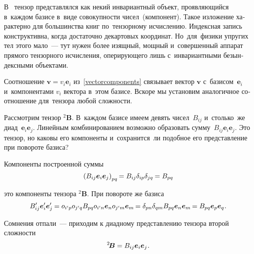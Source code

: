 
\label{para:polyadicrepresentation}

\begin{otherlanguage}{russian}

В~ тензор представлялся как некий инвариантный объект, проявляющийся в~каждом базисе в~виде совокупности чисел~(компонент). \hbox{Такое} изложение характерно для большинства книг по~тензорному исчислению. Индексная запись конструктивна, когда достаточно декартовых координат. Но~для~физики упругих тел этого мало~--- тут нужен более изящный, мощный и~совершенный аппарат прямого тензорного исчисления, оперирующего лишь с~инвариантными безындексными объектами.

Соотношение ${\bm{v} = v_i \bm{e}_i}$ из~\eqref{vectorcomponents} связывает вектор ${\bm{v}}$ с~базисом~${\bm{e}_i}$ и~компонентами ${v_i}$ вектора в~этом базисе. Вскоре мы установим аналогичное соотношение для~тензора любой сложности.

Рассмотрим тензор ${^2\!\bm{B}}$. В~каждом базисе имеем девять чисел~${B_{ij}}$ и~столько~же диад~${\bm{e}_i \bm{e}_j}$. Линейным комбинированием возможно образовать сумму~${B_{ij} \bm{e}_i \bm{e}_j}$. Это тензор, но каковы его компоненты и~сохранится~ли подобное его представление при повороте базиса?

Компоненты построенной суммы
\[
\left( B_{ij} \bm{e}_i \bm{e}_j \right)_{pq} \hspace{-0.2ex} = B_{ij} \delta_{ip} \delta_{jq} \hspace{-0.1ex} = B_{pq}
\]

\vspace{-0.1em} \noindent это компоненты тензора ${^2\!\bm{B}}$. При повороте же базиса
\[
B'_{ij} \bm{e}'_{i} \bm{e}'_{j} \hspace{-0.1ex} = o_{i'p} o_{j'q} B_{pq} o_{i'n} \bm{e}_n o_{j'm} \bm{e}_m \hspace{-0.2ex} = \delta_{pn} \delta_{qm} B_{pq} \bm{e}_n \bm{e}_m \hspace{-0.2ex} = B_{pq} \bm{e}_p \bm{e}_q \hspace{.1ex} .
\]

Сомнения отпали~--- приходим к диадному представлению тензора второй сложности
\begin{equation}\label{polyada:2}
^2\!\bm{B} = B_{ij} \bm{e}_i \bm{e}_j \hspace{.1ex} .
\end{equation}


\end{otherlanguage}
